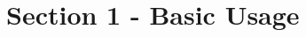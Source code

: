 \documentclass[../../Main.tex]{subfiles}
\begin{document}
\chapter{Section 1 - Basic Usage}


\setcounter{section}{2} %



\setcounter{section}{6} %


\end{document}
